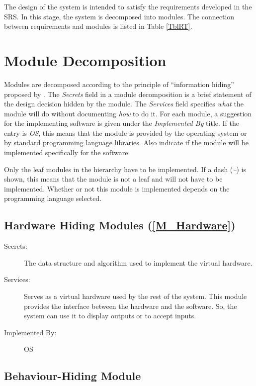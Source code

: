 \documentclass[12pt, titlepage]{article}
\begin{document}
The design of the system is intended to satisfy the requirements developed in
the SRS. In this stage, the system is decomposed into modules. The connection
between requirements and modules is listed in Table \ref{TblRT}.

\section{Module Decomposition} \label{SecMD}

Modules are decomposed according to the principle of ``information hiding''
proposed by \cite{ParnasEtAl1984}. The \emph{Secrets} field in a module
decomposition is a brief statement of the design decision hidden by the
module. The \emph{Services} field specifies \emph{what} the module will do
without documenting \emph{how} to do it. For each module, a suggestion for the
implementing software is given under the \emph{Implemented By} title. If the
entry is \emph{OS}, this means that the module is provided by the operating
system or by standard programming language libraries.  Also indicate if the
module will be implemented specifically for the software.

Only the leaf modules in the
hierarchy have to be implemented. If a dash (\emph{--}) is shown, this means
that the module is not a leaf and will not have to be implemented. Whether or
not this module is implemented depends on the programming language
selected.

\subsection{Hardware Hiding Modules (\texorpdfstring{\cref{M_Hardware}}))}
\label{MG_Hardware}
\begin{description}
\item[Secrets:]The data structure and algorithm used to implement the virtual 
hardware.
\item[Services:]Serves as a virtual hardware used by the rest of the system. 
This module provides the interface between the hardware and the software. So, 
the system can use it to display outputs or to accept inputs.
\item[Implemented By:] OS
\end{description}


\subsection{Behaviour-Hiding Module}
\end{document}
